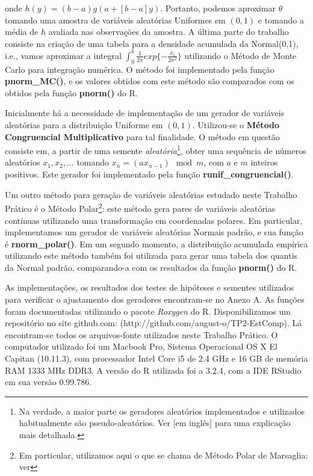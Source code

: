 \documentclass[
	article,			%
	12pt,				%
	twoside,			%
	a4paper,			%
	english,			%
	brazil,				%
	]{abntex2}
\begin{document}
    onde $h(y) = (b-a)g(a+[b-a]y)$. Portanto, podemos aproximar $\theta$ tomando uma amostra de variáveis aleatórias Uniformes em $(0,1)$ e tomando a média de $h$ avaliada nas observações da amostra. A última parte do trabalho consiste na criação de uma tabela para a densidade acumulada da Normal(0,1), i.e., vamos aproximar a integral $\int_0^b \frac{1}{2\pi}exp\{-\frac{x_i}{2\sigma^2}\}$ utilizando o Método de Monte Carlo para integração numérica. O método foi implementado pela função \textbf{pnorm\_MC()}, e os valores obtidos com este método são comparados com os obtidos pela função \textbf{pnorm()} do R.
    
    Inicialmente há a necessidade de implementação de um gerador de variáveis aleatórias para a distribuição Uniforme em $(0,1)$. Utilizou-se o \textbf{Método Congruencial Multiplicativo} para tal finalidade. O método em questão consiste em, a partir de uma semente \textit{aleatória}\footnote{Na verdade, a maior parte os geradores aleatórios implementados e utilizados habitualmente são pseudo-aleatórios. Ver \cite{wiki:001} [em inglês] para uma explicação mais detalhada.}, obter uma sequência de números aleatórios ${x_1,x_2,\dots}$ tomando $x_n = (ax_{n-1}) \mod m$, com $a$ e $m$ inteiros positivos. Este gerador foi implementado pela função \textbf{runif\_congruencial()}. 
    
    Um outro método para geração de variáveis aleatórias estudado neste Trabalho Prático é o Método Polar\footnote{Em particular, utilizamos aqui o que se chama de Método Polar de Marsaglia: ver }: este método gera pares de variáveis aleatórias contínuas utilizando uma transformação em coordenadas polares. Em particular, implementamos um gerador de variáveis aleatórias Normais padrão, e sua função é \textbf{rnorm\_polar()}. Em um segundo momento, a distribuição acumulada empírica utilizando este método também foi utilizada para gerar uma tabela dos quantis da Normal padrão, comparando-a com os resultados da função \textbf{pnorm()} do R.
    
    As implementações, os resultados dos testes de hipóteses e sementes utilizados para verificar o ajustamento dos geradores encontram-se no Anexo A. As funções foram documentadas utilizando o pacote \textit{Roxygen} do R. Disponibilizamos um repositório no site github.com: (http://github.com/august-o/TP2-EstComp). Lá encontram-se todos os arquivos-fonte utilizados neste Trabalho Prático. O computador utilizado foi um Macbook Pro, Sistema Operacional OS X El Capitan (10.11.3), com processador Intel Core i5 de 2.4 GHz e 16 GB de memória RAM 1333 MHz DDR3. A versão do R utilizada foi a 3.2.4, com a IDE RStudio em sua versão 0.99.786.  
    
\end{document}
